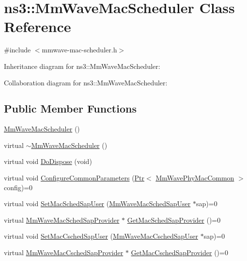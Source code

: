 \hypertarget{classns3_1_1MmWaveMacScheduler}{}\section{ns3\+:\+:Mm\+Wave\+Mac\+Scheduler Class Reference}
\label{classns3_1_1MmWaveMacScheduler}


{\ttfamily \#include $<$mmwave-\/mac-\/scheduler.\+h$>$}



Inheritance diagram for ns3\+:\+:Mm\+Wave\+Mac\+Scheduler\+:


Collaboration diagram for ns3\+:\+:Mm\+Wave\+Mac\+Scheduler\+:
\subsection*{Public Member Functions}
\begin{DoxyCompactItemize}
\item 
\hyperlink{classns3_1_1MmWaveMacScheduler_aad32d6753e98fe1699402d1a722835c4}{Mm\+Wave\+Mac\+Scheduler} ()
\item 
virtual \hyperlink{classns3_1_1MmWaveMacScheduler_a094237227fb5c6d5189f3b75c5a757b1}{$\sim$\+Mm\+Wave\+Mac\+Scheduler} ()
\item 
virtual void \hyperlink{classns3_1_1MmWaveMacScheduler_a2ddcc9f234db5b831b81cfa653047640}{Do\+Dispose} (void)
\item 
virtual void \hyperlink{classns3_1_1MmWaveMacScheduler_a90f58ca507cb0ca6b68bf38e55cd73ac}{Configure\+Common\+Parameters} (\hyperlink{classns3_1_1Ptr}{Ptr}$<$ \hyperlink{classns3_1_1MmWavePhyMacCommon}{Mm\+Wave\+Phy\+Mac\+Common} $>$ config)=0
\item 
virtual void \hyperlink{classns3_1_1MmWaveMacScheduler_ad47bf0b6123724e70f1c2c889d50e5fb}{Set\+Mac\+Sched\+Sap\+User} (\hyperlink{classns3_1_1MmWaveMacSchedSapUser}{Mm\+Wave\+Mac\+Sched\+Sap\+User} $\ast$sap)=0
\item 
virtual \hyperlink{classns3_1_1MmWaveMacSchedSapProvider}{Mm\+Wave\+Mac\+Sched\+Sap\+Provider} $\ast$ \hyperlink{classns3_1_1MmWaveMacScheduler_ad6e09da1a42a74bdc5f4e812e04b9f5f}{Get\+Mac\+Sched\+Sap\+Provider} ()=0
\item 
virtual void \hyperlink{classns3_1_1MmWaveMacScheduler_a01e8541f76617c432ad9c49de738853e}{Set\+Mac\+Csched\+Sap\+User} (\hyperlink{classns3_1_1MmWaveMacCschedSapUser}{Mm\+Wave\+Mac\+Csched\+Sap\+User} $\ast$sap)=0
\item 
virtual \hyperlink{classns3_1_1MmWaveMacCschedSapProvider}{Mm\+Wave\+Mac\+Csched\+Sap\+Provider} $\ast$ \hyperlink{classns3_1_1MmWaveMacScheduler_a5e7075558c86815a9f7742c0fd6eb37b}{Get\+Mac\+Csched\+Sap\+Provider} ()=0
\end{DoxyCompactItemize}
